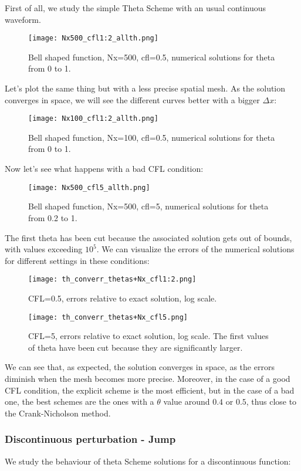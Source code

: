 \documentclass[12pt]{article}
\begin{document}
First of all, we study the simple Theta Scheme with an usual continuous waveform.
\begin{figure}[H]
    \centering
    \texttt{[image: Nx500\_cfl1:2\_allth.png]}
    \caption{Bell shaped function, Nx=500, cfl=0.5, numerical solutions for theta from 0 to 1.}
\end{figure}

Let's plot the same thing but with a less precise spatial mesh. As the solution converges in space, we will see the different curves better with a bigger $\Delta x$:
\begin{figure}[H]
    \centering
    \texttt{[image: Nx100\_cfl1:2\_allth.png]}
    \caption{Bell shaped function, Nx=100, cfl=0.5, numerical solutions for theta from 0 to 1.}
\end{figure}

Now let's see what happens with a bad CFL condition:
\begin{figure}[H]
    \centering
    \texttt{[image: Nx500\_cfl5\_allth.png]}
    \caption{Bell shaped function, Nx=500, cfl=5, numerical solutions for theta from 0.2 to 1.}
\end{figure}
The first theta has been cut because the associated solution gets out of bounds, with values exceeding $10^5$.
We can visualize the errors of the numerical solutions for different settings in these conditions:

\begin{figure}[H]
    \centering
    \texttt{[image: th\_converr\_thetas+Nx\_cfl1:2.png]}
    \caption{CFL=0.5, errors relative to exact solution, log scale.}
\end{figure}

\begin{figure}[H]
    \centering
    \texttt{[image: th\_converr\_thetas+Nx\_cfl5.png]}
    \caption{CFL=5, errors relative to exact solution, log scale. The first values of theta have been cut because they are significantly larger.}
\end{figure}
We can see that, as expected, the solution converges in space, as the errors diminish when the mesh becomes more precise.
Moreover, in the case of a good CFL condition, the explicit scheme is the most efficient, but in the case of a bad one, the best schemes are the ones with a $\theta$ value around $0.4$ or $0.5$, thus close to the Crank-Nicholson method.


\subsubsection*{Discontinuous perturbation - Jump}
We study the behaviour of theta Scheme solutions for a discontinuous function:
\end{document}
